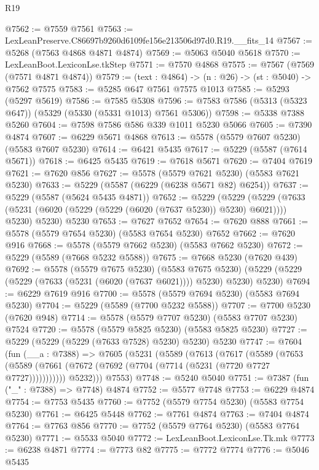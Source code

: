 \begin{lexlean}{R19}
\begin{coremodule}
@7562 := @7559 @7561
@7563 := LexLeanPreserve.C86697b9260d6109fe156e213506d97d0.R19.__fits_14
@7567 := @5268 (@7563 @4868 @4871 @4874)
@7569 := @5063 @5040 @5618
@7570 := LexLeanBoot.LexiconLse.tkStep
@7571 := @7570 @4868
@7575 := @7567 (@7569 (@7571 @4871 @4874))
@7579 := (text : @4864) -> (n : @26) -> (st : @5040) -> @7562 @7575
@7583 := @5285 @647 @7561 @7575 @1013
@7585 := @5293 (@5297 @5619)
@7586 := @7585 @5308
@7596 := @7583 @7586 (@5313 (@5323 @647)) (@5329 (@5330 (@5331 @1013) @7561 @5306))
@7598 := @5338 @7388 @5260
@7604 := @7598 @7586 @586 @339 @1011 @5230 @5066
@7605 := @7390 @4874
@7607 := @6229 @5671 @4868
@7613 := @5578 (@5579 @7607 @5230) (@5583 @7607 @5230)
@7614 := @6421 @5435
@7617 := @5229 (@5587 (@7614 @5671))
@7618 := @6425 @5435
@7619 := @7618 @5671
@7620 := @7404 @7619
@7621 := @7620 @856
@7627 := @5578 (@5579 @7621 @5230) (@5583 @7621 @5230)
@7633 := @5229 (@5587 (@6229 (@6238 @5671 @82) @6254))
@7637 := @5229 (@5587 (@5624 @5435 @4871))
@7652 := @5229
    (@5229
      (@5229 (@7633 (@5231 (@6020 (@5229 (@5229 (@6020 (@7637 @5230)) @5230) @6021)))) @5230)
      @5230)
    @5230
@7653 := @7627 @7652
@7654 := @7620 @888
@7661 := @5578 (@5579 @7654 @5230) (@5583 @7654 @5230) @7652
@7662 := @7620 @916
@7668 := @5578 (@5579 @7662 @5230) (@5583 @7662 @5230)
@7672 := @5229 (@5589 (@7668 @5232 @5588))
@7675 := @7668 @5230 (@7620 @439)
@7692 := @5578
    (@5579 @7675 @5230)
    (@5583 @7675 @5230)
    (@5229 (@5229 (@5229 (@7633 (@5231 (@6020 (@7637 @6021)))) @5230) @5230) @5230)
@7694 := @6229 @7619 @916
@7700 := @5578 (@5579 @7694 @5230) (@5583 @7694 @5230)
@7704 := @5229 (@5589 (@7700 @5232 @5588))
@7707 := @7700 @5230 (@7620 @948)
@7714 := @5578 (@5579 @7707 @5230) (@5583 @7707 @5230) @7524
@7720 := @5578 (@5579 @5825 @5230) (@5583 @5825 @5230)
@7727 := @5229 (@5229 (@5229 (@7633 @7528) @5230) @5230) @5230
@7747 := @7604
    (fun (__a : @7388) =>
    @7605
      (@5231
        (@5589
          (@7613
            (@7617
              (@5589
                (@7653
                  (@5589 (@7661 (@7672 (@7692 (@7704 (@7714 (@5231 (@7720 @7727 @7727)))))))))))
            @5232)))
      @7553)
@7748 := @5240 @5040
@7751 := @7387 (fun ("_" : @7388) => @7748) @4874
@7752 := @5577 @7748
@7753 := @6229 @4874
@7754 := @7753 @5435
@7760 := @7752 (@5579 @7754 @5230) (@5583 @7754 @5230)
@7761 := @6425 @5448
@7762 := @7761 @4874
@7763 := @7404 @4874
@7764 := @7763 @856
@7770 := @7752 (@5579 @7764 @5230) (@5583 @7764 @5230)
@7771 := @5533 @5040
@7772 := LexLeanBoot.LexiconLse.Tk.mk
@7773 := @6238 @4871
@7774 := @7773 @82
@7775 := @7772 @7774
@7776 := @5046 @5435

\end{coremodule}
\end{lexlean}
